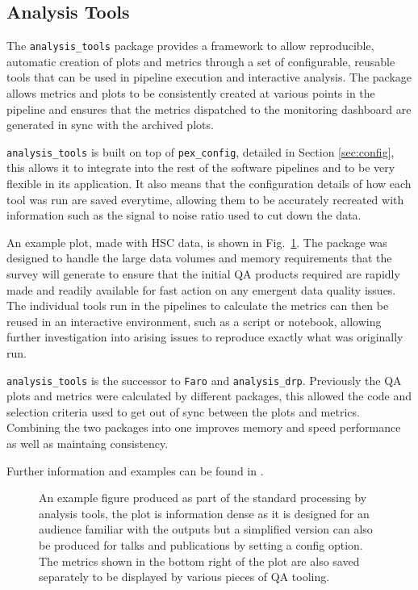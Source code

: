 \subsection{Analysis Tools}

The \texttt{analysis\_tools} package provides a framework to allow reproducible, automatic creation of plots and metrics through a set of configurable, reusable tools that can be used in pipeline execution and interactive analysis.
The package allows metrics and plots to be consistently created at various points in the pipeline and ensures that the metrics dispatched to the monitoring dashboard are generated in sync with the archived plots.

\texttt{analysis\_tools} is built on top of \texttt{pex\_config}, detailed in Section \ref{sec:config}, this allows it to integrate into the rest of the software pipelines and to be very flexible in its application. It also means that the configuration details of how each tool was run are saved everytime, allowing them to be accurately recreated with information such as the signal to noise ratio used to cut down the data.

An example plot, made with HSC data, is shown in Fig.~\ref{fig:atools}.
The package was designed to handle the large data volumes and memory requirements that the survey will generate to ensure that the initial QA products required are rapidly made and readily available for fast action on any emergent data quality issues.
The individual tools run in the pipelines to calculate the metrics can then be reused in an interactive environment, such as a script or notebook, allowing further investigation into arising issues to reproduce exactly what was originally run.

\texttt{analysis\_tools} is the successor to \texttt{Faro} \citet{2022SPIE12189E..0MG} and \texttt{analysis\_drp}. Previously the QA plots and metrics were calculated by different packages, this allowed the code and selection criteria used to get out of sync between the plots and metrics. Combining the two packages into one improves memory and speed performance as well as maintaing consistency.

Further information and examples can be found in \citet{DMTN-314}.

\begin{figure}[h]
\caption{An example figure produced as part of the standard processing by analysis tools, the plot is information dense as it is designed for an audience familiar with the outputs but a simplified version can also be produced for talks and publications by setting a config option.
The metrics shown in the bottom right of the plot are also saved separately to be displayed by various pieces of QA tooling.}
\label{fig:atools}
\end{figure}
